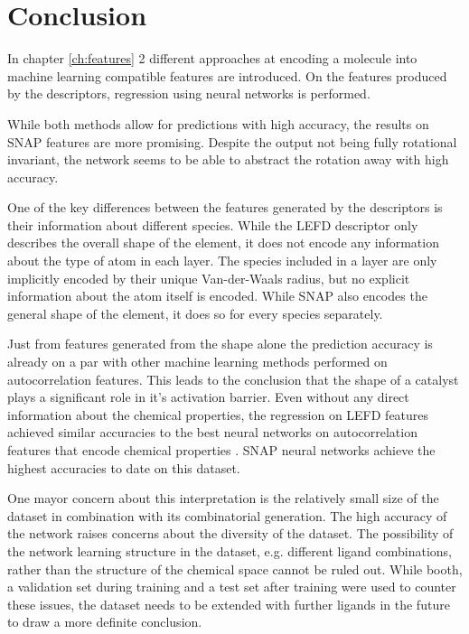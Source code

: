 
\chapter{Conclusion}
\label{ch:Conclusion}
In chapter \ref{ch:features} 2 different approaches at encoding a molecule into machine learning compatible features are introduced.
On the features produced by the descriptors, regression using neural networks is performed.

While both methods allow for predictions with high accuracy, the results on SNAP features are more promising.
Despite the output not being fully rotational invariant, the network seems to be able to abstract the rotation away with high accuracy.

One of the key differences between the features generated by the descriptors is their information about 
different species.
While the LEFD descriptor only describes the overall shape of the element, it does not encode any information about the 
type of atom in each layer.
The species included in a layer are only implicitly encoded by their unique Van-der-Waals radius, but no explicit information about the 
atom itself is encoded.
While SNAP also encodes the general shape of the element, it does so for every species separately.

Just from features generated from the shape alone the prediction accuracy is already on a par with other machine learning methods performed on autocorrelation features.
This leads to the conclusion that the shape of a catalyst plays a significant role in it's activation barrier.
Even without any direct information about the chemical properties, the regression on LEFD features achieved similar accuracies to
the best neural networks on autocorrelation features that encode chemical properties \cite{friederich_dos}.
SNAP neural networks achieve the highest accuracies to date on this dataset.

One mayor concern about this interpretation is the relatively small size of the dataset in combination 
with its combinatorial generation.
The high accuracy of the network raises concerns about the diversity of the dataset.
The possibility of the network learning structure in the dataset, e.g. different ligand combinations,
rather than the structure of the chemical space cannot be ruled out.
While booth, a validation set during training and a test set after training were used to counter these issues,
the dataset needs to be extended with further ligands in the future to draw a more definite conclusion.

